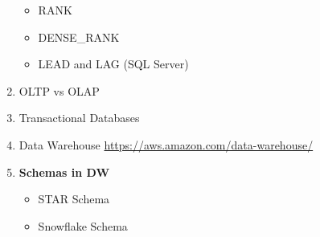 \documentclass[11pt]{article}
\begin{document}
\begin{enumerate}
\begin{itemize}
	\item RANK
	\item DENSE\_RANK
	\item LEAD and LAG (SQL Server)
\end{itemize}
\item OLTP vs OLAP
\item Transactional Databases
\item Data Warehouse \url{https://aws.amazon.com/data-warehouse/}
\item \textbf{Schemas in DW}
\begin{itemize}
	\item STAR Schema
	\item Snowflake Schema
\end{itemize}
\end{enumerate}
\end{document}
